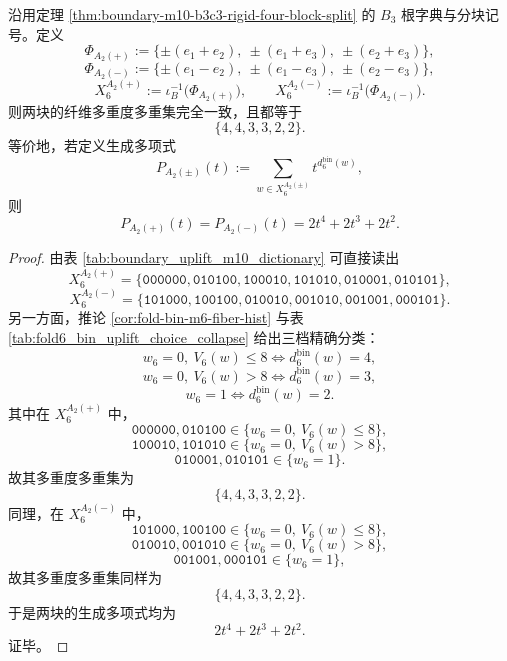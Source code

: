 \begin{theorem}\label{thm:xi-window6-a2pm-identical-fiber-spectrum}
沿用定理 \ref{thm:boundary-m10-b3c3-rigid-four-block-split} 的 \(B_3\) 根字典与分块记号。定义
\[
\Phi_{A_2(+)}
:=
\{\pm(e_1+e_2),\ \pm(e_1+e_3),\ \pm(e_2+e_3)\},
\]
\[
\Phi_{A_2(-)}
:=
\{\pm(e_1-e_2),\ \pm(e_1-e_3),\ \pm(e_2-e_3)\},
\]
\[
X_6^{A_2(+)}:=\iota_B^{-1}\bigl(\Phi_{A_2(+)}\bigr),
\qquad
X_6^{A_2(-)}:=\iota_B^{-1}\bigl(\Phi_{A_2(-)}\bigr).
\]
则两块的纤维多重度多重集完全一致，且都等于
\[
\{4,4,3,3,2,2\}.
\]
等价地，若定义生成多项式
\[
P_{A_2(\pm)}(t):=\sum_{w\in X_6^{A_2(\pm)}} t^{d_6^{\mathrm{bin}}(w)},
\]
则
\[
P_{A_2(+)}(t)=P_{A_2(-)}(t)=2t^4+2t^3+2t^2.
\]
\end{theorem}
\begin{proof}
由表 \ref{tab:boundary_uplift_m10_dictionary} 可直接读出
\[
X_6^{A_2(+)}
=
\{\texttt{000000},\texttt{010100},\texttt{100010},
\texttt{101010},\texttt{010001},\texttt{010101}\},
\]
\[
X_6^{A_2(-)}
=
\{\texttt{101000},\texttt{100100},\texttt{010010},
\texttt{001010},\texttt{001001},\texttt{000101}\}.
\]
另一方面，推论 \ref{cor:fold-bin-m6-fiber-hist} 与表 \ref{tab:fold6_bin_uplift_choice_collapse} 给出三档精确分类：
\[
w_6=0,\ V_6(w)\le 8 \Longleftrightarrow d_6^{\mathrm{bin}}(w)=4,
\]
\[
w_6=0,\ V_6(w)>8 \Longleftrightarrow d_6^{\mathrm{bin}}(w)=3,
\]
\[
w_6=1 \Longleftrightarrow d_6^{\mathrm{bin}}(w)=2.
\]
其中在 \(X_6^{A_2(+)}\) 中，
\[
\texttt{000000},\texttt{010100}\in\{w_6=0,\ V_6(w)\le 8\},
\]
\[
\texttt{100010},\texttt{101010}\in\{w_6=0,\ V_6(w)>8\},
\]
\[
\texttt{010001},\texttt{010101}\in\{w_6=1\}.
\]
故其多重度多重集为
\[
\{4,4,3,3,2,2\}.
\]
同理，在 \(X_6^{A_2(-)}\) 中，
\[
\texttt{101000},\texttt{100100}\in\{w_6=0,\ V_6(w)\le 8\},
\]
\[
\texttt{010010},\texttt{001010}\in\{w_6=0,\ V_6(w)>8\},
\]
\[
\texttt{001001},\texttt{000101}\in\{w_6=1\},
\]
故其多重度多重集同样为
\[
\{4,4,3,3,2,2\}.
\]
于是两块的生成多项式均为
\[
2t^4+2t^3+2t^2.
\]
证毕。
\end{proof}

